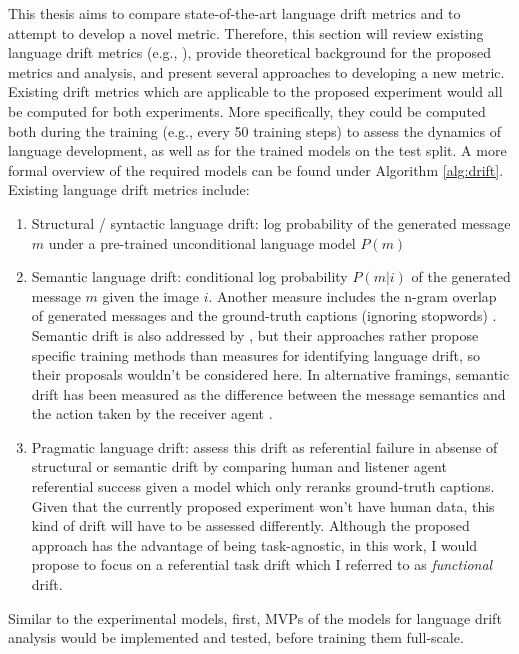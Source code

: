 \documentclass[11pt,letterpaper]{article}
\begin{document}
\begin{enumerate}
This thesis aims to compare state-of-the-art language drift metrics and to attempt to develop a novel metric. Therefore, this section will review existing language drift metrics (e.g., \cite{lazaridou2020multi, lu2020countering}), provide theoretical background for the proposed metrics and analysis, and present several approaches to developing a new metric. 
Existing drift metrics which are applicable to the proposed experiment would all be computed for both experiments. More specifically, they could be computed both during the training (e.g., every 50 training steps) to assess the dynamics of language development, as well as for the trained models on the test split. A more formal overview of the required models can be found under Algorithm \ref{alg:drift}.
Existing language drift metrics include:
\begin{enumerate}
	\item Structural / syntactic language drift: log probability of the generated message $m$ under a pre-trained unconditional language model $P(m)$ \cite{lazaridou2020multi}
	\item Semantic language drift: conditional log probability $P(m|i)$ of the generated message $m$ given the image $i$. Another measure includes the n-gram overlap of generated messages and the ground-truth captions (ignoring stopwords) \cite{lazaridou2020multi}. Semantic drift is also addressed by \cite{lee2019countering, lu2020countering}, but their approaches rather propose specific training methods than measures for identifying language drift, so their proposals wouldn't be considered here.
	In alternative framings, semantic drift has been measured as the difference between the message semantics and the action taken by the receiver agent \cite{jacob2021multitasking}.
	\item Pragmatic language drift: \cite{lazaridou2020multi} assess this drift as referential failure in absense of structural or semantic drift by comparing human and listener agent referential success given a model which only reranks ground-truth captions. Given that the currently proposed experiment won't have human data, this kind of drift will have to be assessed differently. Although the proposed approach has the advantage of being task-agnostic, in this work, I would propose to focus on a referential task drift which I referred to as \textit{functional} drift. 
\end{enumerate}
Similar to the experimental models, first, MVPs of the models for language drift analysis would be implemented and tested, before training them full-scale.


\end{enumerate}
\end{document}
